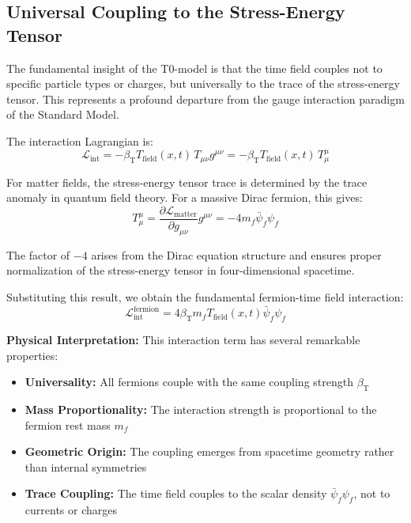 \documentclass[12pt,a4paper]{article}
\newcommand{\Tfield}{T_{\text{field}}(x,t)}
\newcommand{\betaT}{\beta_{\text{T}}}
\begin{document}
	\subsection{Universal Coupling to the Stress-Energy Tensor}
	
	The fundamental insight of the T0-model is that the time field couples not to specific particle types or charges, but universally to the trace of the stress-energy tensor. This represents a profound departure from the gauge interaction paradigm of the Standard Model.
	
	The interaction Lagrangian is:
	\begin{equation}
		\mathcal{L}_{\text{int}} = -\betaT \Tfield \, T_{\mu\nu} g^{\mu\nu} = -\betaT \Tfield \, T^\mu_\mu
	\end{equation}
	
	For matter fields, the stress-energy tensor trace is determined by the trace anomaly in quantum field theory. For a massive Dirac fermion, this gives:
	\begin{equation}
		T^\mu_\mu = \frac{\partial \mathcal{L}_{\text{matter}}}{\partial g_{\mu\nu}} g^{\mu\nu} = -4m_f \bar{\psi}_f \psi_f
	\end{equation}
	
	The factor of $-4$ arises from the Dirac equation structure and ensures proper normalization of the stress-energy tensor in four-dimensional spacetime.
	
	Substituting this result, we obtain the fundamental fermion-time field interaction:
	\begin{equation}
		\mathcal{L}_{\text{int}}^{\text{fermion}} = 4\betaT m_f \Tfield \bar{\psi}_f \psi_f
	\end{equation}
	
	\textbf{Physical Interpretation:} This interaction term has several remarkable properties:
	\begin{itemize}
		\item \textbf{Universality:} All fermions couple with the same coupling strength $\betaT$
		\item \textbf{Mass Proportionality:} The interaction strength is proportional to the fermion rest mass $m_f$
		\item \textbf{Geometric Origin:} The coupling emerges from spacetime geometry rather than internal symmetries
		\item \textbf{Trace Coupling:} The time field couples to the scalar density $\bar{\psi}_f \psi_f$, not to currents or charges
	\end{itemize}
	
\end{document}
